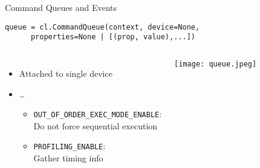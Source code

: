 \begin{frame}[fragile]{Command Queues and Events}
  \begin{lstlisting}[gobble=4]
    queue = cl.CommandQueue(context, device=None, 
      properties=None | [(prop, value),...])
  \end{lstlisting}
  \begin{columns}
        \begin{itemize}
          \item Attached to single device
          \item {}\dots
            \begin{itemize}
              \item \texttt{OUT\_OF\_ORDER\_EXEC\_MODE\_ENABLE}:\\
                Do not force sequential execution
              \item \texttt{PROFILING\_ENABLE}:\\
                Gather timing info
            \end{itemize}
        \end{itemize}
      \texttt{[image: queue.jpeg]}
  \end{columns}
\end{frame}

